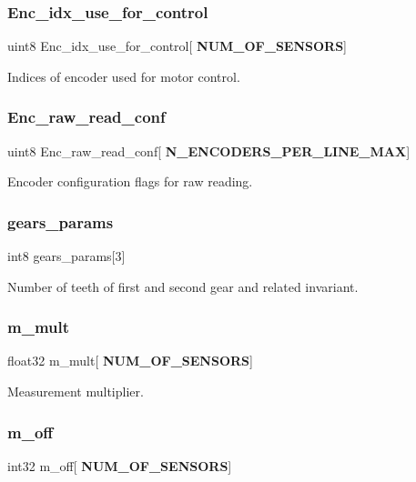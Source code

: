 \subsubsection{Enc\+\_\+idx\+\_\+use\+\_\+for\+\_\+control}
{\footnotesize\ttfamily uint8 Enc\+\_\+idx\+\_\+use\+\_\+for\+\_\+control[\textbf{ N\+U\+M\+\_\+\+O\+F\+\_\+\+S\+E\+N\+S\+O\+RS}]}

Indices of encoder used for motor control. \mbox{\label{structst__encoder_a2542097cdf0fa6d56f5636fddf0f1d61}} 
\subsubsection{Enc\+\_\+raw\+\_\+read\+\_\+conf}
{\footnotesize\ttfamily uint8 Enc\+\_\+raw\+\_\+read\+\_\+conf[\textbf{ N\+\_\+\+E\+N\+C\+O\+D\+E\+R\+S\+\_\+\+P\+E\+R\+\_\+\+L\+I\+N\+E\+\_\+\+M\+AX}]}

Encoder configuration flags for raw reading. \mbox{\label{structst__encoder_ae23966f44fc93a65dd541ea5378c8d10}} 
\subsubsection{gears\+\_\+params}
{\footnotesize\ttfamily int8 gears\+\_\+params[3]}

Number of teeth of first and second gear and related invariant. \mbox{\label{structst__encoder_a72a3f4edd175c9d8981a2595bcde938c}} 
\subsubsection{m\+\_\+mult}
{\footnotesize\ttfamily float32 m\+\_\+mult[\textbf{ N\+U\+M\+\_\+\+O\+F\+\_\+\+S\+E\+N\+S\+O\+RS}]}

Measurement multiplier. \mbox{\label{structst__encoder_ab544f035124be893918bafb611fe88d9}} 
\subsubsection{m\+\_\+off}
{\footnotesize\ttfamily int32 m\+\_\+off[\textbf{ N\+U\+M\+\_\+\+O\+F\+\_\+\+S\+E\+N\+S\+O\+RS}]}

